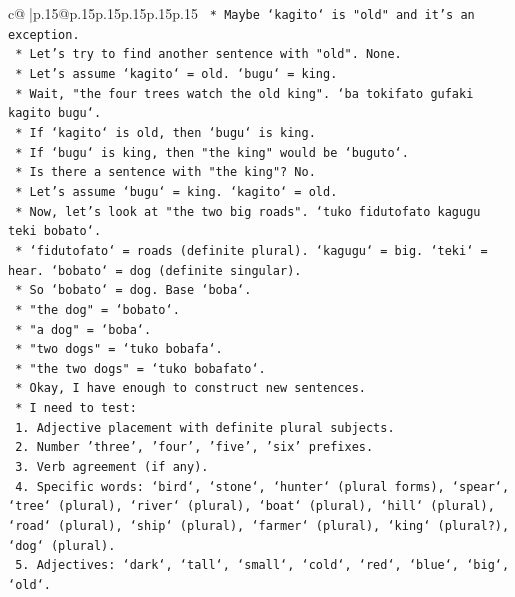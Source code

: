 \documentclass{article}
\begin{document}
{\begin{supertabular}{c@{$\;$}|p{.15\linewidth}@{}p{.15\linewidth}p{.15\linewidth}p{.15\linewidth}p{.15\linewidth}p{.15\linewidth}}
{{{\texttt{        *   Maybe `kagito` is "old" and it's an exception.} \\
\texttt{        *   Let's try to find another sentence with "old". None.} \\
\texttt{        *   Let's assume `kagito` = old. `bugu` = king.} \\
\texttt{        *   Wait, "the four trees watch the old king". `ba tokifato gufaki kagito bugu`.} \\
\texttt{        *   If `kagito` is old, then `bugu` is king.} \\
\texttt{        *   If `bugu` is king, then "the king" would be `buguto`.} \\
\texttt{        *   Is there a sentence with "the king"? No.} \\
\texttt{        *   Let's assume `bugu` = king. `kagito` = old.} \\
\texttt{        *   Now, let's look at "the two big roads". `tuko fidutofato kagugu teki bobato`.} \\
\texttt{        *   `fidutofato` = roads (definite plural). `kagugu` = big. `teki` = hear. `bobato` = dog (definite singular).} \\
\texttt{        *   So `bobato` = dog. Base `boba`.} \\
\texttt{        *   "the dog" = `bobato`.} \\
\texttt{        *   "a dog" = `boba`.} \\
\texttt{        *   "two dogs" = `tuko bobafa`.} \\
\texttt{        *   "the two dogs" = `tuko bobafato`.} \\
\texttt{        *   Okay, I have enough to construct new sentences.} \\
\texttt{        *   I need to test:} \\
\texttt{            1.  Adjective placement with definite plural subjects.} \\
\texttt{            2.  Number 'three', 'four', 'five', 'six' prefixes.} \\
\texttt{            3.  Verb agreement (if any).} \\
\texttt{            4.  Specific words: `bird`, `stone`, `hunter` (plural forms), `spear`, `tree` (plural), `river` (plural), `boat` (plural), `hill` (plural), `road` (plural), `ship` (plural), `farmer` (plural), `king` (plural?), `dog` (plural).} \\
\texttt{            5.  Adjectives: `dark`, `tall`, `small`, `cold`, `red`, `blue`, `big`, `old`.} \\
}}}
\end{supertabular}}
\end{document}
